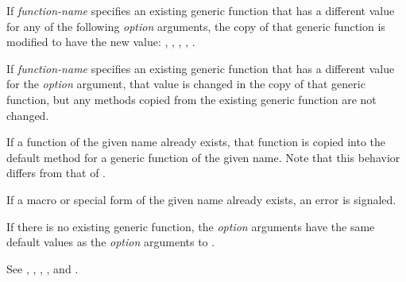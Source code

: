 \begin{defspec}
If \emph{function-name\/} specifies an existing generic function that has a
different value for any of the following \emph{option\/} arguments, the
copy of that generic function is modified to have the new value: 
, , , 
, .

If \emph{function-name\/} specifies an existing generic function that has a
different value for the  \emph{option\/} argument,
that value is changed in the copy of that generic function, but any
methods copied from the existing generic function are not changed.

If a function of the given name already exists, that function is copied into
the default method for a generic function of the given name.  Note that
this behavior differs from that of .

If a macro or special form of the given name already exists, an error
is signaled.

If there is no existing generic function, the \emph{option\/} arguments have
the same default values as the \emph{option\/} arguments to .

See ,
,
,
,
and .
\end{defspec}


